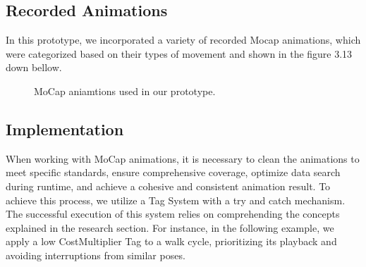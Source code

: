 \documentclass[12pt]{book}
\begin{document}
\subsection{Recorded Animations}
In this prototype, we incorporated a variety of recorded Mocap animations, which were categorized based on their types of movement and shown in the figure 3.13 down bellow.

\begin{figure}
    \centering
    \caption{MoCap aniamtions used in our prototype.}
    \label{tab:my_label}
\end{figure}

\subsection{Implementation}

When working with MoCap animations, it is necessary to clean the animations to meet specific standards, ensure comprehensive coverage, optimize data search during runtime, and achieve a cohesive and consistent animation result.\newline
To achieve this process, we utilize a Tag System with a try and catch mechanism. The successful execution of this system relies on comprehending the concepts explained in the research section. For instance, in the following example, we apply a low CostMultiplier Tag to a walk cycle, prioritizing its playback and avoiding interruptions from similar poses.
\end{document}

